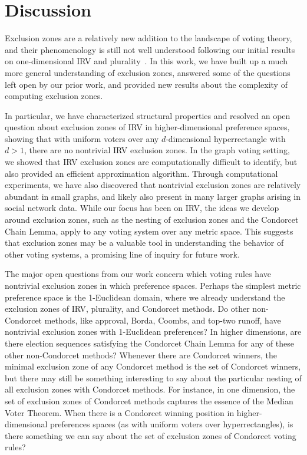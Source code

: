 \documentclass{article}
\theoremstyle{theorem}
\theoremstyle{definition}
\begin{document}
\section{Discussion}

Exclusion zones are a relatively new addition to the landscape of voting theory, and their phenomenology is still not well understood following our initial results on one-dimensional IRV and plurality~\cite{tomlinson2024moderating}.  In this work, we have built up a much more general understanding of exclusion zones, answered some of the questions left open by our prior work, and provided new results about the complexity of computing exclusion zones.

In particular, we have characterized structural properties and resolved an open question about exclusion zones of IRV in higher-dimensional preference spaces, showing that with uniform voters over any $d$-dimensional hyperrectangle with $d >1$, there are no nontrivial IRV exclusion zones. In the graph voting setting, we showed that IRV exclusion zones are computationally difficult to identify, but also provided an efficient approximation algorithm. Through computational experiments, we have also discovered that nontrivial exclusion zones are relatively abundant in small graphs, and likely also present in many larger graphs arising in social network data.  While our focus has been on IRV, the ideas we develop around exclusion zones, such as the nesting of exclusion zones and the Condorcet Chain Lemma, apply to any voting system over any metric space. This suggests that exclusion zones may be a valuable tool in understanding the behavior of other voting systems, a promising line of inquiry for future work. 

The major open questions from our work concern which voting rules have nontrivial exclusion zones in which preference spaces. Perhaps the simplest metric preference space is the 1-Euclidean domain, where we already understand the exclusion zones of IRV, plurality, and Condorcet methods. Do other non-Condorcet methods, like approval, Borda, Coombs, and top-two runoff, have nontrivial exclusion zones with 1-Euclidean preferences? In higher dimensions, are there election sequences satisfying the Condorcet Chain Lemma for any of these other non-Condorcet methods? Whenever there are Condorcet winners, the minimal exclusion zone of any Condorcet method is the set of Condorcet winners, but there may still be something interesting to say about the particular nesting of all exclusion zones with Condorcet methods. For instance, in one dimension, the set of exclusion zones of Condorcet methods captures the essence of the Median Voter Theorem. When there is a Condorcet winning position in higher-dimensional preferences spaces (as with uniform voters over hyperrectangles), is there something we can say about the set of exclusion zones of Condorcet voting rules? 
\end{document}
